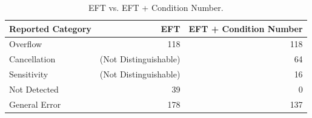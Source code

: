 \begin{table}
  \caption{EFT vs. EFT + Condition Number.}
  \label{tab:eftvseft_cond}
  \centering
  \begin{tabular}{lrr}
    \toprule
    Reported Category & EFT & EFT + Condition Number\\
    \midrule
    Overflow & 118 & 118\\
    Cancellation & (Not Distinguishable) & 64\\
    Sensitivity & (Not Distinguishable) & 16\\
    Not Detected & 39 & 0\\
    General Error & 178 & 137\\
  \bottomrule
\end{tabular}
\end{table}